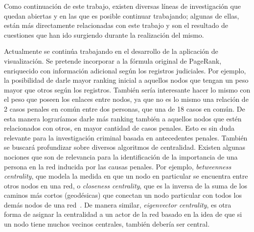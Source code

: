 Como continuación de este trabajo, existen diversas líneas de investigación que quedan abiertas y en las que es posible continuar trabajando; algunas de ellas, están más directamente relacionadas con este trabajo y son el resultado de cuestiones que han ido surgiendo durante la realización del mismo.

Actualmente se 	continúa trabajando en el desarrollo de la aplicación de visualización. Se pretende incorporar a la fórmula original de PageRank, enriquecido con información adicional según los registros judiciales. Por ejemplo, la posibilidad de darle mayor ranking inicial a aquellos nodos que tengan un peso mayor que otros según los registros. También sería interesante hacer lo mismo con el peso que poseen los enlaces entre nodos, ya que no es lo mismo una relación de 2 casos penales en común entre dos personas, que una de 18 casos en común. De esta manera lograríamos darle más ranking también a aquellos nodos que estén relacionados con otros, en mayor cantidad de casos penales. Esto es sin duda relevante para la investigación criminal basada en antecedentes penales.
También se buscará profundizar sobre diversos algoritmos de centralidad. Existen algunas nociones que son de relevancia para la identificación de la importancia de una persona en la red inducida por las causas penales. Por ejemplo, \textit{betweenness centrality}, que modela la medida en que un nodo en particular se encuentra entre otros nodos en una red, o \textit{closeness centrality}, que es la inversa de la suma de los caminos más cortos (geodésicas) que conectan un nodo particular con todos los demás nodos de una red~\cite{newman2005measure}. De manera similar, \textit{eigenvector centrality}, es otra forma de asignar la centralidad a un actor de la red basado en la idea de que si un nodo tiene muchos vecinos centrales, también debería ser central.
 